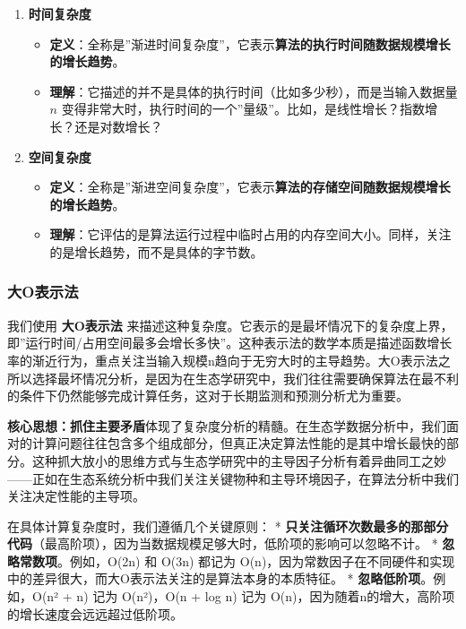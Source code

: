 \documentclass[
]{book}
\providecommand{\tightlist}{%
  \setlength{\itemsep}{0pt}\setlength{\parskip}{0pt}}
\begin{document}
\begin{enumerate}
\def\labelenumi{\arabic{enumi}.}
\tightlist
\item
  \textbf{时间复杂度}

  \begin{itemize}
  \tightlist
  \item
    \textbf{定义}：全称是''渐进时间复杂度''，它表示\textbf{算法的执行时间随数据规模增长的增长趋势}。
  \item
    \textbf{理解}：它描述的并不是具体的执行时间（比如多少秒），而是当输入数据量 \(n\) 变得非常大时，执行时间的一个''量级''。比如，是线性增长？指数增长？还是对数增长？
  \end{itemize}
\item
  \textbf{空间复杂度}

  \begin{itemize}
  \tightlist
  \item
    \textbf{定义}：全称是''渐进空间复杂度''，它表示\textbf{算法的存储空间随数据规模增长的增长趋势}。
  \item
    \textbf{理解}：它评估的是算法运行过程中临时占用的内存空间大小。同样，关注的是增长趋势，而不是具体的字节数。
  \end{itemize}
\end{enumerate}

\hypertarget{ux5927oux8868ux793aux6cd5}{%
\subsubsection{大O表示法}\label{ux5927oux8868ux793aux6cd5}}

我们使用 \textbf{大O表示法} 来描述这种复杂度。它表示的是最坏情况下的复杂度上界，即''运行时间/占用空间最多会增长多快''。这种表示法的数学本质是描述函数增长率的渐近行为，重点关注当输入规模n趋向于无穷大时的主导趋势。大O表示法之所以选择最坏情况分析，是因为在生态学研究中，我们往往需要确保算法在最不利的条件下仍然能够完成计算任务，这对于长期监测和预测分析尤为重要。

\textbf{核心思想：抓住主要矛盾}体现了复杂度分析的精髓。在生态学数据分析中，我们面对的计算问题往往包含多个组成部分，但真正决定算法性能的是其中增长最快的部分。这种抓大放小的思维方式与生态学研究中的主导因子分析有着异曲同工之妙------正如在生态系统分析中我们关注关键物种和主导环境因子，在算法分析中我们关注决定性能的主导项。

在具体计算复杂度时，我们遵循几个关键原则：
* \textbf{只关注循环次数最多的那部分代码}（最高阶项），因为当数据规模足够大时，低阶项的影响可以忽略不计。
* \textbf{忽略常数项}。例如，O(2n) 和 O(3n) 都记为 O(n)，因为常数因子在不同硬件和实现中的差异很大，而大O表示法关注的是算法本身的本质特征。
* \textbf{忽略低阶项}。例如，O(n² + n) 记为 O(n²)，O(n + log n) 记为 O(n)，因为随着n的增大，高阶项的增长速度会远远超过低阶项。
\end{document}

